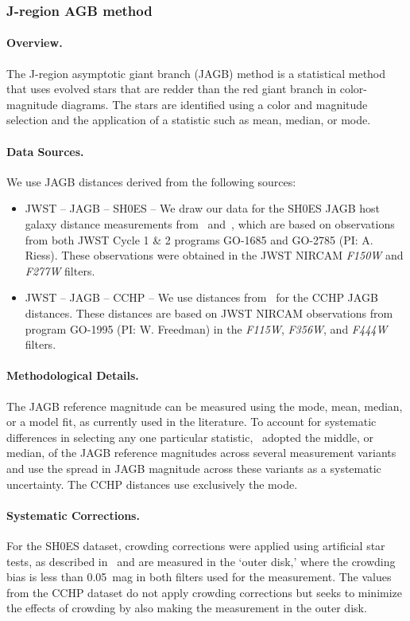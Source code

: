 \subsubsection{J-region AGB method}

\paragraph{Overview.} The J-region asymptotic giant branch (JAGB) method is a statistical method that uses evolved stars that are redder than the red giant branch in color-magnitude diagrams.
The stars are identified using a color and magnitude selection and the application of a statistic such as mean, median, or mode. 

\paragraph{Data Sources.}
We use JAGB distances derived from the following sources:
\begin{itemize}
\item JWST -- JAGB -- SH0ES --
We draw our data for the SH0ES JAGB host galaxy distance measurements from~\citet{2024ApJ...966...20L} and~\citep{2025arXiv250205259L}, which are based on observations from both {JWST} Cycle 1 \& 2 programs GO-1685 and GO-2785 (PI: A. Riess). These observations were obtained in the {JWST} NIRCAM \emph{F150W} and \emph{F277W} filters. 
\item JWST -- JAGB -- CCHP --
We use distances from~\citet{2025ApJ...985..203F} for the CCHP JAGB distances. These distances are based on {JWST} NIRCAM observations from program GO-1995 (PI: W. Freedman) in the \emph{F115W}, \emph{F356W}, and \emph{F444W} filters.
\end{itemize}

\paragraph{Methodological Details.} The JAGB reference magnitude can be measured using the mode, mean, median, or a model fit, as currently used in the literature. To account for systematic differences in selecting any one particular statistic,~\citep{2024ApJ...966...20L} adopted the middle, or median, of the JAGB reference magnitudes across several measurement variants and use the spread in JAGB magnitude across these variants as a systematic uncertainty. The CCHP distances use exclusively the mode.

\paragraph{Systematic Corrections.} For the SH0ES dataset, crowding corrections were applied using artificial star tests, as described in~\citet{2024ApJ...966...20L} and are measured in the `outer disk,' where the crowding bias is less than 0.05~mag in both filters used for the measurement. The values from the CCHP dataset do not apply crowding corrections but seeks to minimize the effects of crowding by also making the measurement in the outer disk. 


